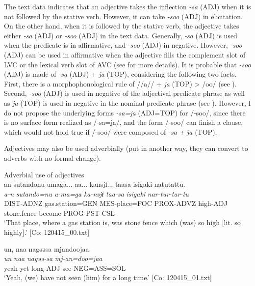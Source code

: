 The text data indicates that an adjective takes the inflection \textit{{}-sa} (ADJ) when it is not followed by the stative verb. However, it can take \textit{{}-soo} (ADJ) in elicitation. On the other hand, when it is followed by the stative verb, the adjective takes either \textit{{}-sa} (ADJ) or \textit{{}-soo} (ADJ) in the text data. Generally, \textit{{}-sa} (ADJ) is used when the predicate is in affirmative, and -\textit{soo} (ADJ) in negative. However, \textit{{}-soo} (ADJ) can be used in affirmative when the adjective fills the complement slot of LVC or the lexical verb slot of AVC (see  for more details). It is probable that \textit{{}-soo} (ADJ) is made of \textit{{}-sa} (ADJ) + \textit{ja} (TOP), considering the following two facts. First, there is a morphophonological rule of //a// + \textit{ja} (TOP) > /oo/ (see ). Second, \textit{{}-soo} (ADJ) is used in negative of the adjectival predicate phrase as well as \textit{ja} (TOP) is used in negative in the nominal predicate phrase (see ). However, I do not propose the underlying forms \textit{{}-sa=ja} (ADJ=TOP) for /-soo/, since there is no surface form realized as /-sa=ja/, and the form /-soo/ can finish a clause, which would not hold true if /-soo/ were composed of \textit{{}-sa} \textit{+} \textit{ja} (TOP).

Adjectives may also be used adverbially (put in another way, they can convert to adverbs with no formal change).

\ea  Adverbial use of adjectives \label{ex:4.51}
\ea{}\\
\glll    an  {\textbar}sutando{\textbar}nu  umaga...  aa...  kansjɨ...  taasa  isigaki  natutattu.\\
      \textit{a-n}  \textit{sutando=nu}  \textit{u-ma=ga}    \textit{ka-nsjɨ}  \textit{taa-sa}  \textit{isigaki}  \textit{nar-tur-tar-tu}\\
      DIST-ADNZ  gas.station=GEN  MES-place=FOC    PROX-ADVZ    high-ADJ  stone.fence  become-PROG-PST-CSL\\
      \glt       ‘That place, where a gas station is, was stone fence which (was) so high [lit. so highly].’ [Co: 120415\_00.txt]

\ex{}%
\glll     {\textbar}un{\textbar},  naa  nagəəsa  mjandoojaa.\\
      \textit{un}  \textit{naa}  \textit{nagəə-sa}  \textit{mj-an=doo=jaa}\\
      yeah  yet  long-ADJ  see-NEG=ASS=SOL\\
      \glt       ‘Yeah, (we) have not seen (him) for a long time.’ [Co: 120415\_01.txt]

